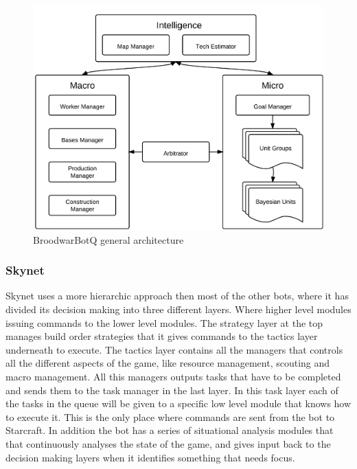 \begin{figure}[h!tbp]
\centering
\includegraphics[scale=0.8]{graphics/bbq.png}
\caption{BroodwarBotQ general architecture}
\label{fig:bthaiarch}
\end{figure}

\subsubsection{Skynet}
Skynet uses a more hierarchic approach then most of the other bots, where it has divided its decision making into three different layers. Where higher level modules issuing commands to the lower level modules. The strategy layer at the top manages build order strategies that it gives commands to the tactics layer underneath to execute. The tactics layer contains all the managers that controls all the different aspects of the game, like resource management, scouting and macro management. All this managers outputs tasks that have to be completed and sends them to the task manager in the last layer. In this task layer each of the tasks in the queue will be given to a specific low level module that knows how to execute it. This is the only place where commands are sent from the bot to Starcraft. In addition the bot has a series of situational analysis modules that that continuously analyses the state of the game, and gives input back to the decision making layers when it identifies something that needs focus.


